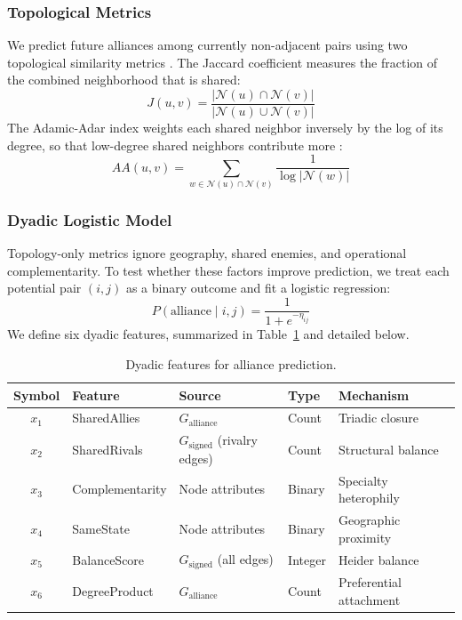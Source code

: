 \documentclass[11pt, a4paper]{article}
\begin{document}
\subsubsection{Topological Metrics}\label{sec:topo_metrics}

We predict future alliances among currently non-adjacent pairs using two topological similarity metrics \citep{libennowell2007link}. The Jaccard coefficient measures the fraction of the combined neighborhood that is shared:
\begin{equation}\label{eq:jaccard}
    J(u, v) = \frac{|\mathcal{N}(u) \cap \mathcal{N}(v)|}{|\mathcal{N}(u) \cup \mathcal{N}(v)|}
\end{equation}
The Adamic-Adar index weights each shared neighbor inversely by the log of its degree, so that low-degree shared neighbors contribute more \citep{adamic2003friends}:
\begin{equation}\label{eq:adamicadar}
    AA(u, v) = \sum_{w \in \mathcal{N}(u) \cap \mathcal{N}(v)} \frac{1}{\log |\mathcal{N}(w)|}
\end{equation}

\subsubsection{Dyadic Logistic Model}\label{sec:logistic_methods}

Topology-only metrics ignore geography, shared enemies, and operational complementarity. To test whether these factors improve prediction, we treat each potential pair $(i,j)$ as a binary outcome and fit a logistic regression:
\begin{equation}\label{eq:logistic}
    P(\text{alliance} \mid i, j) = \frac{1}{1 + e^{-\eta_{ij}}}
\end{equation}
We define six dyadic features, summarized in Table~\ref{tab:features} and detailed below.

\begin{table}[H]
\centering
\caption{Dyadic features for alliance prediction.}
\label{tab:features}
\small
\begin{tabular}{cllll}
\toprule
\textbf{Symbol} & \textbf{Feature} & \textbf{Source} & \textbf{Type} & \textbf{Mechanism} \\
\midrule
$x_1$ & SharedAllies & $G_{\text{alliance}}$ & Count & Triadic closure \\
$x_2$ & SharedRivals & $G_{\text{signed}}$ (rivalry edges) & Count & Structural balance \\
$x_3$ & Complementarity & Node attributes & Binary & Specialty heterophily \\
$x_4$ & SameState & Node attributes & Binary & Geographic proximity \\
$x_5$ & BalanceScore & $G_{\text{signed}}$ (all edges) & Integer & Heider balance \\
$x_6$ & DegreeProduct & $G_{\text{alliance}}$ & Count & Preferential attachment \\
\bottomrule
\end{tabular}
\end{table}
\end{document}
